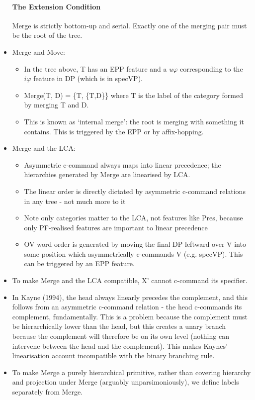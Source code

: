 \documentclass{article}
\begin{document}
\begin{itemize}
    \paragraph{The Extension Condition} Merge is strictly bottom-up and serial. Exactly one of the merging pair must be the root of the tree.
    \item Merge and Move:
    \begin{itemize}
        \item In the tree above, T has an EPP feature and a $u\varphi$ corresponding to the $i\varphi$ feature in DP (which is in specVP).
        \item Merge(T, D) = \{T, \{T,D\}\} where T is the label of the category formed by merging T and D.
        \item This is known as `internal merge': the root is merging with something it contains. This is triggered by the EPP or by affix-hopping.
    \end{itemize}
    \item Merge and the LCA:
    \begin{itemize}
        \item Asymmetric c-command always maps into linear precedence; the hierarchies generated by Merge are linearised by LCA.
        \item The linear order is directly dictated by asymmetric c-command relations in any tree - not much more to it 
        \item Note only categories matter to the LCA, not features like Pres, because only PF-realised features are important to linear precedence
        \item OV word order is generated by moving the final DP leftward over V into some position which asymmetrically c-commands V (e.g. specVP). This can be triggered by an EPP feature.
    \end{itemize}
    \item To make Merge and the LCA compatible, X' cannot c-command its specifier.
    \item In Kayne (1994), the head always linearly precedes the complement, and this follows from an asymmetric c-command relation - the head c-commands its complement, fundamentally. This is a problem because the complement must be hierarchically lower than the head, but this creates a unary branch because the complement will therefore be on its own level (nothing can intervene between the head and the complement). This makes Kaynes' linearisation account incompatible with the binary branching rule.
    \item To make Merge a purely hierarchical primitive, rather than covering hierarchy and projection under Merge (arguably unparsimoniously), we define labels separately from Merge.

\end{itemize}
\end{document}
